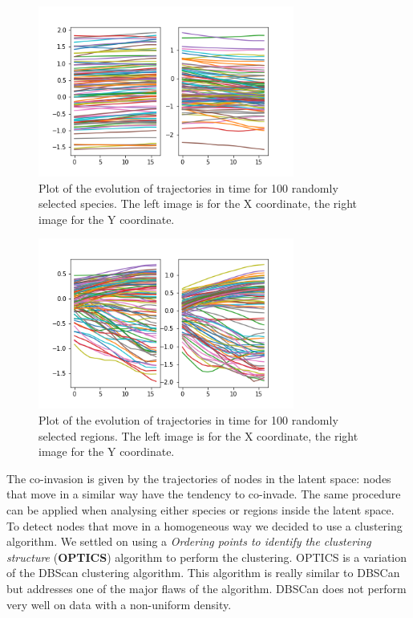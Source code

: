 \documentclass[mscthesis]{usiinfthesis}
\begin{document}
\begin{figure}[H]
    \centering
    \includegraphics[width=0.75\textwidth]{trajectories_species.png}
    \caption{Plot of the evolution of trajectories in time for 100 randomly selected species. The left image is for the X coordinate, the right image for the Y coordinate.}
    \label{fig:trajectories_species}
\end{figure}

\begin{figure}[H]
    \centering
    \includegraphics[width=0.75\textwidth]{trajectories_region.png}
    \caption{Plot of the evolution of trajectories in time for 100 randomly selected regions. The left image is for the X coordinate, the right image for the Y coordinate.}
    \label{fig:trajectories_region}
\end{figure}

The co-invasion is given by the trajectories of nodes in the latent space: nodes that move in a similar way have the tendency to co-invade. The same procedure can be applied when analysing either species or regions inside the latent space. To detect nodes that move in a homogeneous way we decided to use a clustering algorithm. We settled on using a \textit{Ordering points to identify the clustering structure} (\textbf{OPTICS}) algorithm to perform the clustering. OPTICS is a variation of the DBScan clustering algorithm. This algorithm is really similar to DBSCan but addresses one of the major flaws of the algorithm. DBSCan does not perform very well on data with a non-uniform density. 
\end{document}
